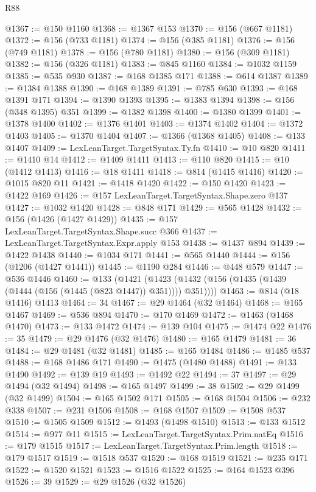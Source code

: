 \begin{lexlean}{R88}
\begin{coremodule}
@1367 := @150 @1160
@1368 := @1367 @153
@1370 := @156 (@667 @1181)
@1372 := @156 (@733 @1181)
@1374 := @156 (@385 @1181)
@1376 := @156 (@749 @1181)
@1378 := @156 (@780 @1181)
@1380 := @156 (@309 @1181)
@1382 := @156 (@326 @1181)
@1383 := @845 @1160
@1384 := @1032 @1159
@1385 := @535 @930
@1387 := @168 @1385 @171
@1388 := @614 @1387
@1389 := @1384 @1388
@1390 := @168 @1389
@1391 := @785 @630
@1393 := @168 @1391 @171
@1394 := @1390 @1393
@1395 := @1383 @1394
@1398 := @156 (@348 @1395) @351
@1399 := @1382 @1398
@1400 := @1380 @1399
@1401 := @1378 @1400
@1402 := @1376 @1401
@1403 := @1374 @1402
@1404 := @1372 @1403
@1405 := @1370 @1404
@1407 := @1366 (@1368 @1405)
@1408 := @133 @1407
@1409 := LexLeanTarget.TargetSyntax.Ty.fn
@1410 := @10 @820
@1411 := @1410 @14
@1412 := @1409 @1411
@1413 := @110 @820
@1415 := @10 (@1412 @1413)
@1416 := @18 @1411
@1418 := @814 (@1415 @1416)
@1420 := @1015 @820 @11
@1421 := @1418 @1420
@1422 := @150 @1420
@1423 := @1422 @169
@1426 := @157 LexLeanTarget.TargetSyntax.Shape.zero @137
@1427 := @1032 @1420
@1428 := @848 @171
@1429 := @565 @1428
@1432 := @156 (@1426 (@1427 @1429))
@1435 := @157 LexLeanTarget.TargetSyntax.Shape.succ @366
@1437 := LexLeanTarget.TargetSyntax.Expr.apply @153
@1438 := @1437 @894
@1439 := @1422 @1438
@1440 := @1034 @171
@1441 := @565 @1440
@1444 := @156 (@1206 (@1427 @1441))
@1445 := @1190 @284
@1446 := @448 @579
@1447 := @536 @1446
@1460 := @133
    (@1421 (@1423 (@1432 (@156 (@1435 (@1439 (@1444 (@156 (@1445 (@823 @1447)) @351)))) @351))))
@1463 := @814 (@18 @1416) @1413
@1464 := 34
@1467 := @29 @1464 (@32 @1464)
@1468 := @165 @1467
@1469 := @536 @894
@1470 := @170 @1469
@1472 := @1463 (@1468 @1470)
@1473 := @133 @1472
@1474 := @139 @104
@1475 := @1474 @22
@1476 := 35
@1479 := @29 @1476 (@32 @1476)
@1480 := @165 @1479
@1481 := 36
@1484 := @29 @1481 (@32 @1481)
@1485 := @165 @1484
@1486 := @1485 @537
@1488 := @168 @1486 @171
@1490 := @1475 (@1480 @1488)
@1491 := @133 @1490
@1492 := @139 @19
@1493 := @1492 @22
@1494 := 37
@1497 := @29 @1494 (@32 @1494)
@1498 := @165 @1497
@1499 := 38
@1502 := @29 @1499 (@32 @1499)
@1504 := @165 @1502 @171
@1505 := @168 @1504
@1506 := @232 @338
@1507 := @231 @1506
@1508 := @168 @1507
@1509 := @1508 @537
@1510 := @1505 @1509
@1512 := @1493 (@1498 @1510)
@1513 := @133 @1512
@1514 := @977 @11
@1515 := LexLeanTarget.TargetSyntax.Prim.natEq
@1516 := @179 @1515
@1517 := LexLeanTarget.TargetSyntax.Prim.length
@1518 := @179 @1517
@1519 := @1518 @537
@1520 := @168 @1519
@1521 := @235 @171
@1522 := @1520 @1521
@1523 := @1516 @1522
@1525 := @164 @1523 @396
@1526 := 39
@1529 := @29 @1526 (@32 @1526)

\end{coremodule}
\end{lexlean}
